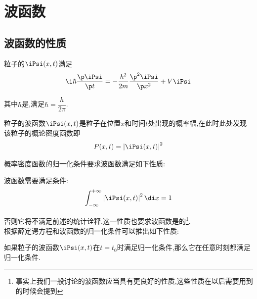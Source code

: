 \documentclass{ctexart}
\begin{document}
\section{波函数}
\subsection{波函数的性质}
\begin{theorem}[薛定谔方程]
    粒子的$\iPsi(x,t)$满足\[\i\hbar\dfrac{\p\iPsi}{\p t}=-\dfrac{\hbar^2}{2m}\dfrac{\p^2\iPsi}{\p x^2}+V\iPsi\]
\end{theorem}
其中$\hbar$是,满足$\hbar=\dfrac{h}{2\pi}$.
\begin{theorem}[波函数的统计诠释]
    粒子的波函数$\iPsi(x,t)$是粒子在位置$x$和时间$t$处出现的概率幅,在此时此处发现该粒子的概论密度函数即
    \[P(x,t)=\left|\iPsi(x,t)\right|^2\]
\end{theorem}
概率密度函数的归一化条件要求波函数满足如下性质:
\begin{theorem}[归一化I]
    波函数需要满足条件:
    \[\int_{-\infty}^{+\infty}\left|\iPsi(x,t)\right|^2\di x=1\]
\end{theorem}
否则它将不满足前述的统计诠释.这一性质也要求波函数是的\footnote{事实上我们一般讨论的波函数应当具有更良好的性质,这些性质在以后需要用到的时候会提到}.\\
\indent 根据薛定谔方程和波函数的归一化条件可以推出如下性质:
\begin{theorem}[归一化II]
    如果粒子的波函数$\iPsi(x,t)$在$t=t_0$时满足归一化条件,那么它在任意时刻都满足归一化条件.
\end{theorem}
\end{document}

